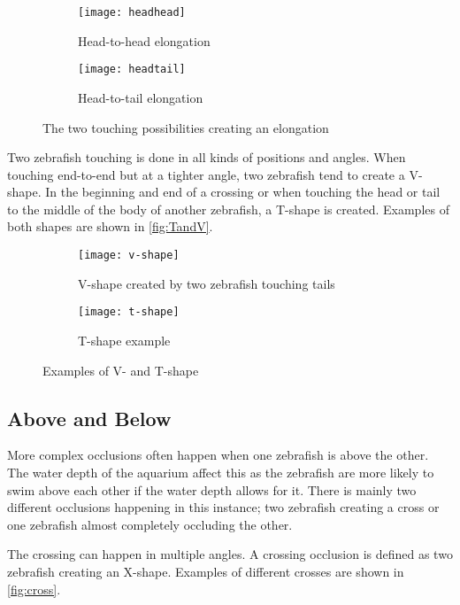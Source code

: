 \begin{figure}[H]
	\centering
	\begin{subfigure}[b]{0.47\textwidth}
		\texttt{[image: headhead]}
		\caption{Head-to-head elongation}
		\label{fig:headhead}
	\end{subfigure}
	\begin{subfigure}[b]{0.47\textwidth}
		\texttt{[image: headtail]}
		\caption{Head-to-tail elongation}
		\label{fig:headtail}
	\end{subfigure}
\caption{The two touching possibilities creating an elongation}
\label{fig:elongation}
\end{figure}

Two zebrafish touching is done in all kinds of positions and angles. When touching end-to-end but at a tighter angle, two zebrafish tend to create a V-shape. In the beginning and end of a crossing or when touching the head or tail to the middle of the body of another zebrafish, a T-shape is created. Examples of both shapes are shown in \autoref{fig:TandV}.

\begin{figure}[H]
	\centering
	\begin{subfigure}[b]{0.47\textwidth}
		\texttt{[image: v-shape]}
		\caption{V-shape created by two zebrafish touching tails}
		\label{fig:v-shape}
	\end{subfigure}
	\begin{subfigure}[b]{0.47\textwidth}
		\texttt{[image: t-shape]}
		\caption{T-shape example}
		\label{fig:t-shape}
	\end{subfigure}
\caption{Examples of V- and T-shape}
\label{fig:TandV}
\end{figure}

\subsection{Above and Below}
More complex occlusions often happen when one zebrafish is above the other. The water depth of the aquarium affect this as the zebrafish are more likely to swim above each other if the water depth allows for it. There is mainly two different occlusions happening in this instance; two zebrafish creating a cross or one zebrafish almost completely occluding the other.

The crossing can happen in multiple angles. A crossing occlusion is defined as two zebrafish creating an X-shape. Examples of different crosses are shown in \autoref{fig:cross}. 

